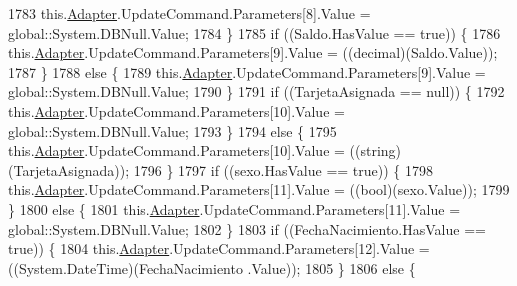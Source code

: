 \begin{DoxyCode}
1783                 this.\hyperlink{class_proyecto___integrador__3_1_1ds_usuarios_table_adapters_1_1_usuarios_table_adapter_a46252bad9dadbf20130beca25d50b5bc}{Adapter}.UpdateCommand.Parameters[8].Value = global::System.DBNull.Value;
1784             \}
1785             \textcolor{keywordflow}{if} ((Saldo.HasValue == \textcolor{keyword}{true})) \{
1786                 this.\hyperlink{class_proyecto___integrador__3_1_1ds_usuarios_table_adapters_1_1_usuarios_table_adapter_a46252bad9dadbf20130beca25d50b5bc}{Adapter}.UpdateCommand.Parameters[9].Value = ((decimal)(Saldo.Value));
1787             \}
1788             \textcolor{keywordflow}{else} \{
1789                 this.\hyperlink{class_proyecto___integrador__3_1_1ds_usuarios_table_adapters_1_1_usuarios_table_adapter_a46252bad9dadbf20130beca25d50b5bc}{Adapter}.UpdateCommand.Parameters[9].Value = global::System.DBNull.Value;
1790             \}
1791             \textcolor{keywordflow}{if} ((TarjetaAsignada == null)) \{
1792                 this.\hyperlink{class_proyecto___integrador__3_1_1ds_usuarios_table_adapters_1_1_usuarios_table_adapter_a46252bad9dadbf20130beca25d50b5bc}{Adapter}.UpdateCommand.Parameters[10].Value = global::System.DBNull.Value;
1793             \}
1794             \textcolor{keywordflow}{else} \{
1795                 this.\hyperlink{class_proyecto___integrador__3_1_1ds_usuarios_table_adapters_1_1_usuarios_table_adapter_a46252bad9dadbf20130beca25d50b5bc}{Adapter}.UpdateCommand.Parameters[10].Value = ((string)(TarjetaAsignada));
1796             \}
1797             \textcolor{keywordflow}{if} ((sexo.HasValue == \textcolor{keyword}{true})) \{
1798                 this.\hyperlink{class_proyecto___integrador__3_1_1ds_usuarios_table_adapters_1_1_usuarios_table_adapter_a46252bad9dadbf20130beca25d50b5bc}{Adapter}.UpdateCommand.Parameters[11].Value = ((bool)(sexo.Value));
1799             \}
1800             \textcolor{keywordflow}{else} \{
1801                 this.\hyperlink{class_proyecto___integrador__3_1_1ds_usuarios_table_adapters_1_1_usuarios_table_adapter_a46252bad9dadbf20130beca25d50b5bc}{Adapter}.UpdateCommand.Parameters[11].Value = global::System.DBNull.Value;
1802             \}
1803             \textcolor{keywordflow}{if} ((FechaNacimiento.HasValue == \textcolor{keyword}{true})) \{
1804                 this.\hyperlink{class_proyecto___integrador__3_1_1ds_usuarios_table_adapters_1_1_usuarios_table_adapter_a46252bad9dadbf20130beca25d50b5bc}{Adapter}.UpdateCommand.Parameters[12].Value = ((System.DateTime)(FechaNacimiento
      .Value));
1805             \}
1806             \textcolor{keywordflow}{else} \{

\end{DoxyCode}
